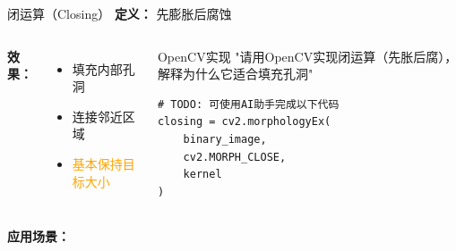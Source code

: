 \begin{frame}{闭运算（Closing）}
    \textbf{定义：} 先膨胀后腐蚀

    \vspace{0.3cm}

    \begin{columns}
        \textbf{效果：}
        \begin{itemize}
            \item 填充内部孔洞
            \item 连接邻近区域
            \item \textcolor{orange}{基本保持目标大小}
        \end{itemize}

        \begin{block}{OpenCV实现}
        \aihint{} "请用OpenCV实现闭运算（先胀后腐），解释为什么它适合填充孔洞"
        \begin{lstlisting}
# TODO: 可使用AI助手完成以下代码
closing = cv2.morphologyEx(
    binary_image,
    cv2.MORPH_CLOSE,
    kernel
)
        \end{lstlisting}
        \end{block}
    \end{columns}

    \vspace{0.3cm}

    \textbf{应用场景：} 
\end{frame}

